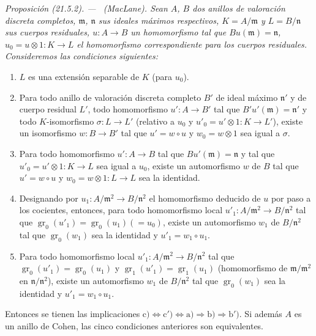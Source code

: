 \documentclass[10pt,oneside]{book}
\makeatletter
\newcommand{\setmanualcurrentlabel}[1]{\def\@currentlabel{#1}}
\newcommand{\oldpage}[2][]{%
  \setcounter{footnote}{0}%
  \marginpar{\scriptsize\textbf{#1}~|~#2}\ignorespaces}
\newenvironment{proposition}[1][]{%
  \setmanualcurrentlabel{#1}\par\medskip\noindent\itshape Proposición (#1). ---\ }{\par}
\makeatother
\begin{document}
\begin{proposition}[21.5.2]
\label{0.21.5.2-es}
\textnormal{(MacLane).}
Sean $A$, $B$ dos anillos de valoración discreta completos, $\mathfrak m$,
$\mathfrak n$ sus ideales máximos respectivos, $K=A/\mathfrak m$ y
$L=B/\mathfrak n$ sus cuerpos residuales, $u:A\to B$ un homomorfismo tal que
$Bu(\mathfrak m)=\mathfrak n$, $u_0=u\otimes 1:K\to L$ el homomorfismo
correspondiente para los cuerpos residuales. Consideremos las condiciones siguientes:
\begin{enumerate}
  \item[\rm a)] $L$ es una extensión separable de $K$ (para $u_0$).
  \item[\rm b)] Para todo anillo de valoración discreta completo $B'$ de ideal
  máximo $\mathfrak n'$ y de cuerpo residual $L'$,
\oldpage[0\textsubscript{IV-1}]{165}
  todo homomorfismo
  $u':A\to B'$ tal que $B'u'(\mathfrak m)=\mathfrak n'$ y todo
  $K$-isomorfismo $\sigma:L\to L'$ (relativo a $u_0$ y
  $u'_0=u'\otimes1:K\to L'$), existe un isomorfismo $w:B\to B'$ tal que
  $u'=w\circ u$ y $w_0=w\otimes1$ sea igual a $\sigma$.
  \item[\rm b$'$)] Para todo homomorfismo $u':A\to B$ tal que
  $Bu'(\mathfrak m)=\mathfrak n$ y tal que $u'_0=u'\otimes1:K\to L$ sea igual
  a $u_0$, existe un automorfismo $w$ de $B$ tal que $u'=w\circ u$ y
  $w_0=w\otimes1:L\to L$ sea la identidad.
  \item[\rm c)] Designando por $u_1:A/\mathfrak m^2\to B/\mathfrak n^2$
  el homomorfismo deducido de $u$ por paso a los cocientes, entonces, para todo
  homomorfismo local $u'_1:A/\mathfrak m^2\to B/\mathfrak n^2$ tal que
  $\operatorname{gr}_0(u'_1)=\operatorname{gr}_0(u_1)(=u_0)$, existe un
  automorfismo $w_1$ de $B/\mathfrak n^2$ tal que
  $\operatorname{gr}_0(w_1)$ sea la identidad y $u'_1=w_1\circ u_1$.
  \item[\rm c$'$)] Para todo homomorfismo local $u'_1:A/\mathfrak m^2\to
  B/\mathfrak n^2$ tal que $\operatorname{gr}_0(u'_1)=\operatorname{gr}_0(u_1)$
  y $\operatorname{gr}_1(u'_1)=\operatorname{gr}_1(u_1)$
  (homomorfismo de $\mathfrak m/\mathfrak m^2$ en
  $\mathfrak n/\mathfrak n^2$), existe un automorfismo $w_1$ de $B/\mathfrak n^2$
  tal que $\operatorname{gr}_0(w_1)$ sea la identidad y $u'_1=w_1\circ u_1$.
\end{enumerate}
Entonces se tienen las implicaciones $\mathrm{c})\Leftrightarrow\mathrm{c}')\Leftrightarrow\mathrm{a})\Rightarrow\mathrm{b})
 \Rightarrow\mathrm{b}')$. Si además $A$ es un anillo de Cohen, las cinco condiciones
anteriores son equivalentes.

\end{proposition}
\end{document}
